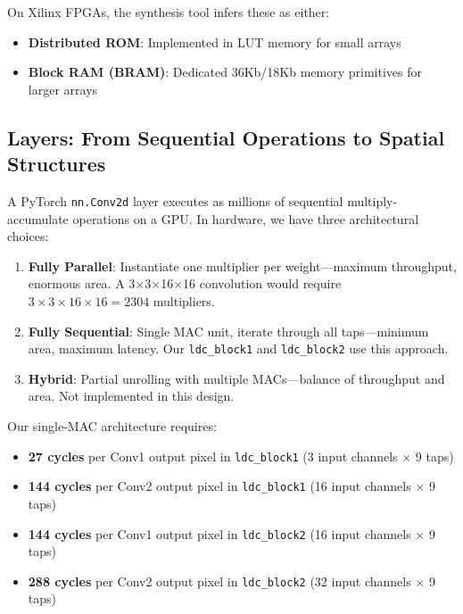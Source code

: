 \documentclass[11pt,a4paper]{report}
\begin{document}
On Xilinx FPGAs, the synthesis tool infers these as either:
\begin{itemize}[leftmargin=2em]
    \item \textbf{Distributed ROM}: Implemented in LUT memory for small arrays
    \item \textbf{Block RAM (BRAM)}: Dedicated 36Kb/18Kb memory primitives for larger arrays
\end{itemize}

\subsection{Layers: From Sequential Operations to Spatial Structures}

A PyTorch \texttt{nn.Conv2d} layer executes as millions of sequential multiply-accumulate operations on a GPU. In hardware, we have three architectural choices:

\begin{enumerate}[leftmargin=2em]
    \item \textbf{Fully Parallel}: Instantiate one multiplier per weight---maximum throughput, enormous area. A 3$\times$3$\times$16$\times$16 convolution would require $3 \times 3 \times 16 \times 16 = 2304$ multipliers.
    
    \item \textbf{Fully Sequential}: Single MAC unit, iterate through all taps---minimum area, maximum latency. Our \texttt{ldc\_block1} and \texttt{ldc\_block2} use this approach.
    
    \item \textbf{Hybrid}: Partial unrolling with multiple MACs---balance of throughput and area. Not implemented in this design.
\end{enumerate}

Our single-MAC architecture requires:
\begin{itemize}[leftmargin=2em]
    \item \textbf{27 cycles} per Conv1 output pixel in \texttt{ldc\_block1} (3 input channels $\times$ 9 taps)
    \item \textbf{144 cycles} per Conv2 output pixel in \texttt{ldc\_block1} (16 input channels $\times$ 9 taps)
    \item \textbf{144 cycles} per Conv1 output pixel in \texttt{ldc\_block2} (16 input channels $\times$ 9 taps)
    \item \textbf{288 cycles} per Conv2 output pixel in \texttt{ldc\_block2} (32 input channels $\times$ 9 taps)
\end{itemize}
\end{document}
